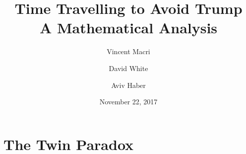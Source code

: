 \documentclass[letterpaper,12pt]{report}
\title{\Huge Time Travelling to Avoid Trump\\\LARGE A Mathematical Analysis}
\author{Vincent Macri \and David White \and Aviv Haber}
\date{November 22, 2017}
\begin{document}
	\maketitle
	
	\tableofcontents
	\clearpage
	\part{The Twin Paradox}\label{part:twinParadox}
		
		
	\printbibliography
\end{document}
